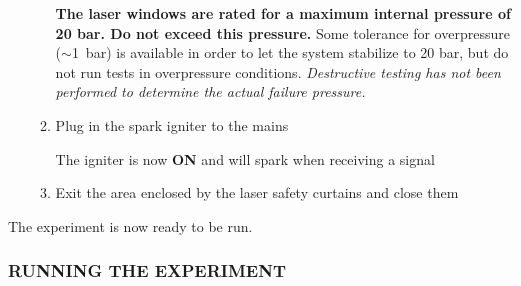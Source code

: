\begin{enumerate}
\begin{enumerate}

    \warningsymbol \textbf{The
    laser windows are rated for a maximum internal pressure of 20 bar.
    Do not exceed this
    pressure.}
    Some tolerance for overpressure ($\sim$1~bar) is available
    in order to let the system stabilize to 20 bar, but do not run tests
    in overpressure conditions. \emph{Destructive testing has not been
    performed to determine the actual failure pressure.}
  \item
    Plug in the spark igniter to the mains

    \warningsymbol The igniter is now \textbf{ON} and will spark when receiving a
    signal
  \item
    Exit the area enclosed by the laser safety curtains and close them
  \end{enumerate}
\end{enumerate}

The experiment is now ready to be run.

\subsubsection{RUNNING THE EXPERIMENT}\label{running-the-experiment}

